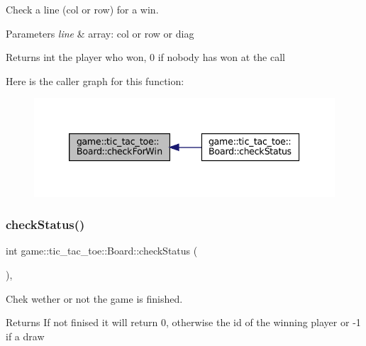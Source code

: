 Check a line (col or row) for a win. 


\begin{DoxyParams}{Parameters}
{\em line} & array\+: col or row or diag \\
\hline
\end{DoxyParams}
\begin{DoxyReturn}{Returns}
int the player who won, 0 if nobody has won at the call 
\end{DoxyReturn}
Here is the caller graph for this function\+:
\nopagebreak
\begin{figure}[H]
\begin{center}
\leavevmode
\includegraphics[width=339pt]{classgame_1_1tic__tac__toe_1_1_board_ac100c056a65c288951f7ffec0f3fd4ad_icgraph}
\end{center}
\end{figure}
\mbox{\label{classgame_1_1tic__tac__toe_1_1_board_ae91180193e944c9c58d7d1d0f439918e}} 
\subsubsection{\texorpdfstring{check\+Status()}{checkStatus()}}
{\footnotesize\ttfamily int game\+::tic\+\_\+tac\+\_\+toe\+::\+Board\+::check\+Status (\begin{DoxyParamCaption}{ }\end{DoxyParamCaption})\hspace{0.3cm}{\ttfamily [override]}, {\ttfamily [virtual]}}



Chek wether or not the game is finished. 

\begin{DoxyReturn}{Returns}
If not finised it will return 0, otherwise the id of the winning player or -\/1 if a draw 
\end{DoxyReturn}


